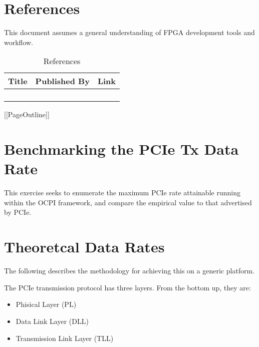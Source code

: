\newpage

\tableofcontents

\newpage

\listoffigures

\newpage

\listoftables

\newpage

\section{References}
\label{sec:references}
This document assumes a general understanding of FPGA development tools and workflow.
	\begin{center}
		\begin{table}[H]
		\caption {References}
		\label{table:references}
			\begin{tabularx}{\textwidth}{|c|c|X|}
			\hline
			\rowcolor{blue}
			\textbf{Title} & \textbf{Published By} & \textbf{Link} \\
			\hline
			 & & \url{} \\
			\hline
			&  & \url{} \\
			\hline
			 &  & \url{} \\
			\hline
			\\
			\hline
			\end{tabularx}
		\end{table}
	\end{center}

\newpage

[[PageOutline]]
\section{Benchmarking the PCIe Tx Data Rate}

This exercise seeks to enumerate the maximum PCIe rate attainable running within the OCPI framework, and compare the empirical value to that advertised by PCIe.

\section{Theoretcal Data Rates}

The following describes the methodology for achieving this on a generic platform.

The PCIe transmission protocol has three layers.  From the bottom up, they are:
\begin{itemize}
\item{Phisical Layer (PL)}
\item{Data Link Layer (DLL)}
\item{Transmission Link Layer (TLL)}
\end{itemize}

